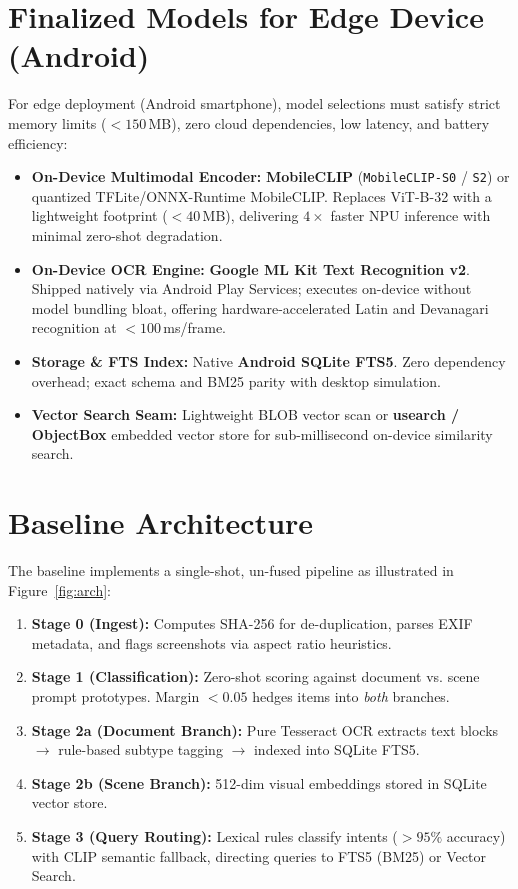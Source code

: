 \documentclass[10.5pt,twocolumn]{article}
\begin{document}
\section{Finalized Models for Edge Device (Android)}
For edge deployment (Android smartphone), model selections must satisfy strict memory limits ($<150$\,MB), zero cloud dependencies, low latency, and battery efficiency:
\begin{itemize}
    \item \textbf{On-Device Multimodal Encoder:} \textbf{MobileCLIP} (\texttt{MobileCLIP-S0} / \texttt{S2}) or quantized TFLite/ONNX-Runtime MobileCLIP. Replaces ViT-B-32 with a lightweight footprint ($<40$\,MB), delivering $4\times$ faster NPU inference with minimal zero-shot degradation.
    \item \textbf{On-Device OCR Engine:} \textbf{Google ML Kit Text Recognition v2}. Shipped natively via Android Play Services; executes on-device without model bundling bloat, offering hardware-accelerated Latin and Devanagari recognition at $<100$\,ms/frame.
    \item \textbf{Storage \& FTS Index:} Native \textbf{Android SQLite FTS5}. Zero dependency overhead; exact schema and BM25 parity with desktop simulation.
    \item \textbf{Vector Search Seam:} Lightweight BLOB vector scan or \textbf{usearch / ObjectBox} embedded vector store for sub-millisecond on-device similarity search.
\end{itemize}

\section{Baseline Architecture}
The baseline implements a single-shot, un-fused pipeline as illustrated in Figure~\ref{fig:arch}:
\begin{enumerate}
    \item \textbf{Stage 0 (Ingest):} Computes SHA-256 for de-duplication, parses EXIF metadata, and flags screenshots via aspect ratio heuristics.
    \item \textbf{Stage 1 (Classification):} Zero-shot scoring against document vs. scene prompt prototypes. Margin $<0.05$ hedges items into \textit{both} branches.
    \item \textbf{Stage 2a (Document Branch):} Pure Tesseract OCR extracts text blocks $\rightarrow$ rule-based subtype tagging $\rightarrow$ indexed into SQLite FTS5.
    \item \textbf{Stage 2b (Scene Branch):} 512-dim visual embeddings stored in SQLite vector store.
    \item \textbf{Stage 3 (Query Routing):} Lexical rules classify intents ($>95\%$ accuracy) with CLIP semantic fallback, directing queries to FTS5 (BM25) or Vector Search.
\end{enumerate}
\end{document}
